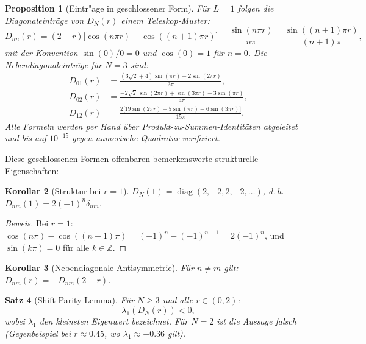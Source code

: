 ﻿\documentclass[12pt,a4paper]{article}
\newtheorem{theorem}{Satz}[section]
\newtheorem{proposition}[theorem]{Proposition}
\newtheorem{corollary}[theorem]{Korollar}
\theoremstyle{definition}
\theoremstyle{remark}
\begin{document}
\begin{proposition}[Eintr"age in geschlossener Form]
\label{prop:closed-form}
Für $L = 1$ folgen die Diagonaleinträge von $D_N(r)$ einem Teleskop-Muster:
\[
  D_{nn}(r) = (2-r)\bigl[\cos(n\pi r) - \cos((n{+}1)\pi r)\bigr]
  - \frac{\sin(n\pi r)}{n\pi} - \frac{\sin((n{+}1)\pi r)}{(n{+}1)\pi},
\]
mit der Konvention $\sin(0)/0 = 0$ und $\cos(0) = 1$ für $n = 0$. Die Nebendiagonaleinträge für $N = 3$ sind:
\begin{align*}
  D_{01}(r) &= \frac{(3\sqrt{2}+4)\sin(\pi r) - 2\sin(2\pi r)}{3\pi}, \\
  D_{02}(r) &= \frac{-2\sqrt{2}\,\sin(2\pi r) + \sin(3\pi r) - 3\sin(\pi r)}{4\pi}, \\
  D_{12}(r) &= \frac{2\bigl[19\sin(2\pi r) - 5\sin(\pi r) - 6\sin(3\pi r)\bigr]}{15\pi}.
\end{align*}
Alle Formeln werden per Hand über Produkt-zu-Summen-Identitäten abgeleitet und bis auf $10^{-15}$ gegen numerische Quadratur verifiziert.
\end{proposition}

Diese geschlossenen Formen offenbaren bemerkenswerte strukturelle Eigenschaften:

\begin{corollary}[Struktur bei $r = 1$]
\label{cor:r-one}
$D_N(1) = \operatorname{diag}(2, -2, 2, -2, \ldots)$, d.\,h. $D_{nm}(1) = 2(-1)^n \delta_{nm}$.
\end{corollary}

\begin{proof}[Beweis]
Bei $r = 1$: $\cos(n\pi) - \cos((n{+}1)\pi) = (-1)^n - (-1)^{n+1} = 2(-1)^n$, und $\sin(k\pi) = 0$ für alle $k \in \mathbb{Z}$.
\end{proof}

\begin{corollary}[Nebendiagonale Antisymmetrie]
\label{cor:antisym}
Für $n \neq m$ gilt: $D_{nm}(r) = -D_{nm}(2-r)$.
\end{corollary}

\begin{theorem}[Shift-Parity-Lemma]
\label{thm:shift-parity}
Für $N \geq 3$ und alle $r \in (0, 2)$:
\[
  \lambda_1(D_N(r)) < 0,
\]
wobei $\lambda_1$ den kleinsten Eigenwert bezeichnet. Für $N = 2$ ist die Aussage falsch (Gegenbeispiel bei $r \approx 0.45$, wo $\lambda_1 \approx +0.36$ gilt).
\end{theorem}
\end{document}
